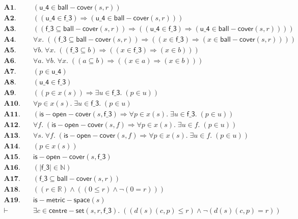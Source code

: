 \documentclass[11pt]{article}
\begin{document}
\begin{align*}
  \mathbf{A1.}\quad & (\mathsf{u\_4} \in \mathsf{ball{-}cover}(s, r)) \\
  \mathbf{A2.}\quad & ((\mathsf{u\_4} \in \mathsf{f\_3}) \Rightarrow (\mathsf{u\_4} \in \mathsf{ball{-}cover}(s, r))) \\
  \mathbf{A3.}\quad & ((\mathsf{f\_3} \subseteq \mathsf{ball{-}cover}(s, r)) \Rightarrow ((\mathsf{u\_4} \in \mathsf{f\_3}) \Rightarrow (\mathsf{u\_4} \in \mathsf{ball{-}cover}(s, r)))) \\
  \mathbf{A4.}\quad & \forall x.\; ((\mathsf{f\_3} \subseteq \mathsf{ball{-}cover}(s, r)) \Rightarrow ((x \in \mathsf{f\_3}) \Rightarrow (x \in \mathsf{ball{-}cover}(s, r)))) \\
  \mathbf{A5.}\quad & \forall b.\; \forall x.\; ((\mathsf{f\_3} \subseteq b) \Rightarrow ((x \in \mathsf{f\_3}) \Rightarrow (x \in b))) \\
  \mathbf{A6.}\quad & \forall a.\; \forall b.\; \forall x.\; ((a \subseteq b) \Rightarrow ((x \in a) \Rightarrow (x \in b))) \\
  \mathbf{A7.}\quad & (p \in \mathsf{u\_4}) \\
  \mathbf{A8.}\quad & (\mathsf{u\_4} \in \mathsf{f\_3}) \\
  \mathbf{A9.}\quad & ((p \in x(s)) \Rightarrow \exists u \in \mathsf{f\_3}.\; (p \in u)) \\
  \mathbf{A10.}\quad & \forall p \in x(s).\; \exists u \in \mathsf{f\_3}.\; (p \in u) \\
  \mathbf{A11.}\quad & (\mathsf{is{-}open{-}cover}(s, \mathsf{f\_3}) \Rightarrow \forall p \in x(s).\; \exists u \in \mathsf{f\_3}.\; (p \in u)) \\
  \mathbf{A12.}\quad & \forall f.\; (\mathsf{is{-}open{-}cover}(s, f) \Rightarrow \forall p \in x(s).\; \exists u \in f.\; (p \in u)) \\
  \mathbf{A13.}\quad & \forall s.\; \forall f.\; (\mathsf{is{-}open{-}cover}(s, f) \Rightarrow \forall p \in x(s).\; \exists u \in f.\; (p \in u)) \\
  \mathbf{A14.}\quad & (p \in x(s)) \\
  \mathbf{A15.}\quad & \mathsf{is{-}open{-}cover}(s, \mathsf{f\_3}) \\
  \mathbf{A16.}\quad & (|\mathsf{f\_3}| \in \mathbb{N}) \\
  \mathbf{A17.}\quad & (\mathsf{f\_3} \subseteq \mathsf{ball{-}cover}(s, r)) \\
  \mathbf{A18.}\quad & ((r \in \mathbb{R}) \wedge ((0 \leq r) \wedge \neg (0 = r))) \\
  \mathbf{A19.}\quad & \mathsf{is{-}metric{-}space}(s) \\
  \vdash\quad & \exists c \in \mathsf{centre{-}set}(s, r, \mathsf{f\_3}).\; ((d(s)(c, p) \leq r) \wedge \neg (d(s)(c, p) = r))
\end{align*}
\end{document}
